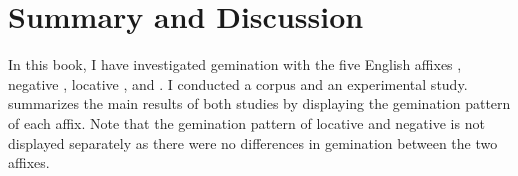 \chapter{Summary and Discussion} \label{Conclusion}

In this book, I have investigated gemination with the five English affixes , negative , locative ,  and . I conducted a corpus and an experimental study. 
 summarizes the main results of both studies by displaying the gemination pattern of each affix. Note that the gemination pattern of locative and negative  is not displayed separately as there were no differences in gemination between the two affixes. 





\begin{table*}[b!]
	\caption{Overview of gemination in corpus and experimental study}
	\label{tbl:Overview gemination in corpus and experimental study}
	
 
		\renewcommand{\arraystretch}{1.5}
 
\end{table*}


